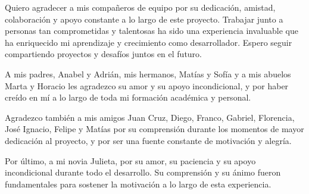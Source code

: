 Quiero agradecer a mis compañeros de equipo por su dedicación, amistad, colaboración y apoyo
constante a lo largo de este proyecto. Trabajar junto a personas tan comprometidas y
talentosas ha sido una experiencia invaluable que ha enriquecido mi aprendizaje y
crecimiento como desarrollador. Espero seguir compartiendo proyectos y desafíos juntos en el futuro.

A mis padres, Anabel y Adrián, mis hermanos, Matías y Sofía y a mis abuelos Marta y Horacio les agradezco su amor
y su apoyo incondicional, y por haber creído en mí a lo largo de toda mi formación
académica y personal.

Agradezco también a mis amigos Juan Cruz, Diego, Franco, Gabriel, Florencia,
José Ignacio, Felipe y Matías por su comprensión durante los momentos de mayor
dedicación al proyecto, y por ser una fuente constante de motivación y alegría.

Por último, a mi novia Julieta, por su amor, su paciencia y su apoyo incondicional
durante todo el desarrollo. Su comprensión y su ánimo fueron fundamentales para
sostener la motivación a lo largo de esta experiencia.